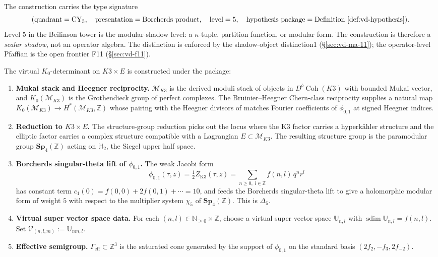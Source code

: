 \documentclass[11pt]{memoir}
\providecommand{\sdim}{\operatorname{sdim}}
\providecommand{\Coh}{\operatorname{Coh}}
\providecommand{\cM}{\mathcal{M}}
\providecommand{\cV}{\mathcal{V}}
\providecommand{\bH}{\mathbb{H}}
\providecommand{\bZ}{\mathbb{Z}}
\providecommand{\bN}{\mathbb{N}}
\providecommand{\bU}{\mathbb{U}}
\providecommand{\Sp}{\mathbf{Sp}}
\begin{document}
The construction carries the type signature
\[
  (\text{quadrant} = \text{CY}_3,\quad
   \text{presentation} = \text{Borcherds product},\quad
   \text{level} = 5,\quad
   \text{hypothesis package} = \text{Definition~\ref{def:vd-hypothesis}}).
\]
Level $5$ in the Beilinson tower is the modular-shadow level: a
$\kappa$-tuple, partition function, or modular form. The construction
is therefore a \emph{scalar shadow}, not an operator algebra. The
distinction is enforced by the shadow-object distinction1
(\S\ref{sec:vd-ma-11}); the operator-level Pfaffian is the open
frontier F11 (\S\ref{sec:vd-f11}).

\begin{definition}
\label{def:vd-hypothesis}
The virtual $K_0$-determinant on $K3 \times E$ is constructed under
the package:
\begin{enumerate}
\item \textbf{Mukai stack and Heegner reciprocity.} $\cM_{K3}$ is the
  derived moduli stack of objects in $D^b\Coh(K3)$ with bounded Mukai
  vector, and $K_0(\cM_{K3})$ is the Grothendieck group of perfect
  complexes. The Bruinier--Heegner Chern-class reciprocity supplies a
  natural map $K_0(\cM_{K3}) \to H^*(\cM_{K3}, \bZ)$ whose pairing with
  the Heegner divisors of \cite{Bruinier2002} matches Fourier
  coefficients of $\phi_{0,1}$ at signed Heegner indices.
\item \textbf{Reduction to $K3 \times E$.} The structure-group
  reduction picks out the locus where the K3 factor carries a
  hyperk\"ahler structure and the elliptic factor carries a complex
  structure compatible with a Lagrangian $E \subset \cM_{K3}$. The
  resulting structure group is the paramodular group
  $\Sp_4(\bZ)$ acting on $\bH_2$, the Siegel upper half space.
\item \textbf{Borcherds singular-theta lift of $\phi_{0,1}$.}
  The weak Jacobi form
  \[
    \phi_{0,1}(\tau, z)
    = \tfrac12 Z_{\mathrm{K3}}(\tau, z)
    = \sum_{n \ge 0,\; l \in \bZ} f(n,l)\, q^{n} r^{l}
  \]
  has constant term $c_1(0) = f(0,0) + 2 f(0,1) + \cdots = 10$, and
  feeds the Borcherds singular-theta lift to give a holomorphic
  modular form of weight $5$ with respect to the multiplier system
  $\chi_5$ of $\Sp_4(\bZ)$. This is $\Delta_5$.
\item \textbf{Virtual super vector space data.} For each $(n,l) \in
  \bN_{\ge 0} \times \bZ$, choose a virtual super vector space
  $\bU_{n,l}$ with $\sdim \bU_{n,l} = f(n,l)$. Set
  $\cV_{(n,l,m)} := \bU_{nm,l}$.
\item \textbf{Effective semigroup.} $\Gamma_{\mathrm{eff}} \subset
  \bZ^3$ is the saturated cone generated by the support of
  $\phi_{0,1}$ on the standard basis $(2 f_2, -f_3, 2 f_{-2})$.
\end{enumerate}
\end{definition}
\end{document}
